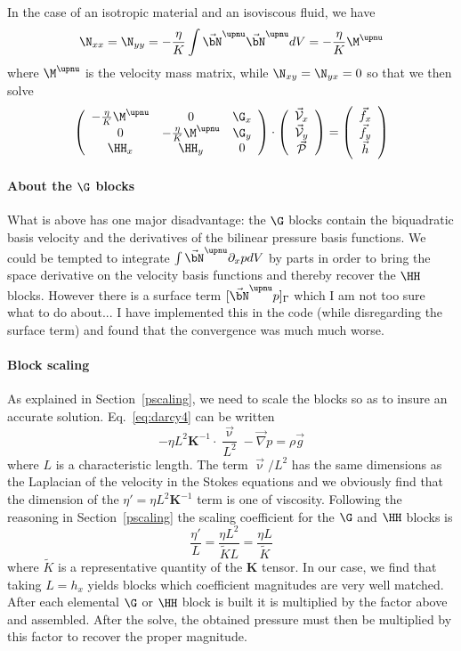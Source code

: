 In the case of an isotropic material and an isoviscous fluid, 
we have 
\[
\N_{xx} = \N_{yy} 
= - \frac{\eta}{K}  \int \vec{\bN}^\upnu \vec{\bN}^\upnu dV
= - \frac{\eta}{K}  \M^\upnu 
\]
where $\M^\upnu$ is the velocity mass matrix, while $\N_{xy} = \N_{yx} = 0$ so that we then solve
\[
\left(
\begin{array}{ccc}
-\frac{\eta}{K} \M^\upnu & 0 & \G_x \\
0 & -\frac{\eta}{K} \M^\upnu & \G_y \\
\HH_{x} & \HH_y & 0 
\end{array}
\right)
\cdot
\left(
\begin{array}{c}
\vec{\cal V}_x \\
\vec{\cal V}_y \\ 
\vec{\cal P}
\end{array}
\right)
=
\left(
\begin{array}{c}
\vec{f}_x \\ 
\vec{f}_y \\ 
\vec{h}
\end{array}
\right)
\]





\paragraph{About the $\G$ blocks} What is above has one major disadvantage: the 
$\G$ blocks contain the biquadratic basis velocity  and the derivatives of the bilinear pressure basis functions. 
We could be tempted to integrate $\int \vec{\bN}^\upnu \partial_xp dV$ by parts in order to bring the space derivative on the velocity basis functions and thereby recover the $\HH$ blocks. However there is a surface term $[ \vec{\bN}^\upnu p]_\Gamma$ which I am not too sure what to do about... I have implemented this in the code (while disregarding the surface term) and found that the convergence was much much worse.


\paragraph{Block scaling} As explained in Section~\ref{pscaling}, we need to scale the blocks so as to insure an accurate solution. Eq.~\eqref{eq:darcy4} can be written 
\[
-\eta L^2 {\bm K}^{-1} \cdot \frac{\vec\upnu}{L^2} - \vec\nabla p = \rho \vec{g}
\]
where $L$ is a characteristic length. The term $\vec{\upnu}/L^2$ has the same dimensions as the Laplacian of the velocity in the Stokes equations and we obviously find that the dimension of 
the $\eta'=\eta L^2 {\bm K}^{-1}$ term is one of viscosity. 
Following the reasoning in Section~\ref{pscaling} the scaling coefficient for the $\G$ and $\HH$ blocks is 
\[
\frac{\eta'}{L} = \frac{\eta L^2 }{\tilde{K} L} 
= \frac{\eta L}{\tilde{K}}
\]
where $\tilde{K}$ is a representative quantity of the ${\bm K}$ tensor. In our case, we find that taking $L=h_x$ yields blocks 
which coefficient magnitudes are very well matched.
After each elemental $\G$ or $\HH$ block is built it is 
multiplied by the factor above and assembled. 
After the solve, the obtained pressure must then be multiplied by this factor to recover the proper magnitude.


